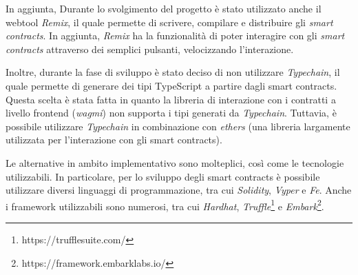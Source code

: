 In aggiunta, Durante lo svolgimento del progetto è stato utilizzato anche il webtool \textit{Remix}, il quale permette di scrivere, compilare e distribuire gli \textit{smart contracts}. In aggiunta, \textit{Remix} ha la funzionalità di poter interagire con gli \textit{smart contracts} attraverso dei semplici pulsanti, velocizzando l'interazione.

Inoltre, durante la fase di sviluppo è stato deciso di non utilizzare \textit{Typechain}, il quale permette di generare dei tipi TypeScript a partire dagli smart contracts. Questa scelta è stata fatta in quanto la libreria di interazione con i contratti a livello frontend (\textit{wagmi}) non supporta i tipi generati da \textit{Typechain}. Tuttavia, è possibile utilizzare \textit{Typechain} in combinazione con \textit{ethers} (una libreria largamente utilizzata per l'interazione con gli smart contracts).

Le alternative in ambito implementativo sono molteplici, così come le tecnologie utilizzabili. In particolare, per lo sviluppo degli smart contracts è possibile utilizzare diversi linguaggi di programmazione, tra cui \textit{Solidity}, \textit{Vyper} e \textit{Fe}. Anche i framework utilizzabili sono numerosi, tra cui \textit{Hardhat}, \textit{Truffle}\footnote{https://trufflesuite.com/} e \textit{Embark}\footnote{https://framework.embarklabs.io/}.